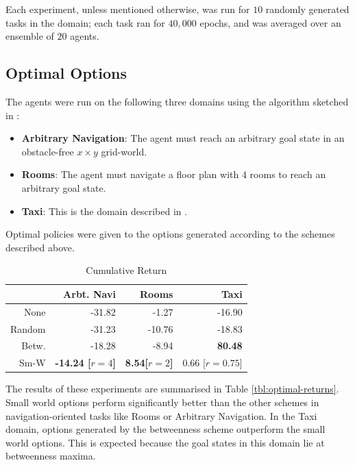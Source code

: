 Each experiment, unless mentioned otherwise, was run for $10$ randomly
generated tasks in the domain; each task ran for $40,000$ epochs, and
was averaged over an ensemble of $20$ agents.

\subsection{Optimal Options}
\label{sec:sw:experiments:optimal}
The agents were run on the following three domains using the algorithm
sketched in :
\begin{itemize}
   \item \textbf{Arbitrary Navigation}: The agent must reach an
     arbitrary goal state in an obstacle-free $x \times y$ grid-world. 
   \item \textbf{Rooms}: The agent must navigate a floor plan with
     4 rooms to reach an arbitrary goal state.
   \item \textbf{Taxi}: This is the domain described in
     .
\end{itemize}

Optimal policies were given to the options generated according to the
schemes described above. 

\begin{table}
 \centering
 \begin{tabular}{ r | r r r }
  \toprule
             & Arbt. Navi           & Rooms               & Taxi                  \\ 
  \midrule
   None      & -31.82               &  -1.27              & -16.90                \\
   Random    & -31.23               & -10.76              & -18.83                \\
   Betw.     & -18.28               & -8.94               &  {\bf 80.48}          \\
   Sm-W      & {\bf -14.24 [$r=4$]} & {\bf 8.54[$r=2$]}   &   0.66 [$r=0.75$]     \\
  \bottomrule
 \end{tabular}
 \caption{Cumulative Return}
 \label{tbl:optimal-returns}
\end{table}

The results of these experiments are summarised in
Table \autoref{tbl:optimal-returns}. Small world options perform significantly
better than the other schemes in navigation-oriented tasks like Rooms or
Arbitrary Navigation. In the Taxi domain, options generated by the
betweenness scheme outperform the small world options. This is expected
because the goal states in this domain lie at betweenness maxima.

